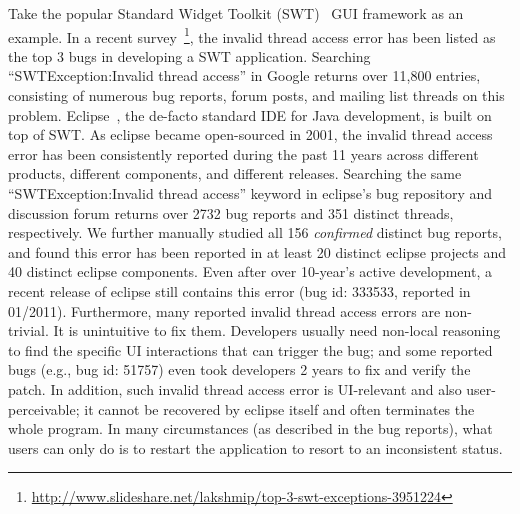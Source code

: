 Take the popular Standard Widget Toolkit (SWT)~\cite{swt} GUI framework as an example. 
In a recent survey~\footnote{\url{http://www.slideshare.net/lakshmip/top-3-swt-exceptions-3951224}}, the invalid thread access error
has been listed as the top 3 bugs in developing a SWT application. Searching
``SWTException:Invalid thread access'' in Google returns over 11,800 entries,
consisting of numerous bug reports, forum posts, and mailing list threads on
this problem. Eclipse~\cite{eclipse}, the de-facto standard IDE for Java development,
is built on top of SWT. As eclipse became open-sourced in 2001, the invalid thread access error has
been consistently reported during the past 11 years across different products, different components, and different releases.
Searching the same ``SWTException:Invalid thread access'' keyword in eclipse's bug repository
and discussion forum returns over 2732 bug reports and 351 distinct threads, respectively. 
We further manually studied all 156 \textit{confirmed} distinct bug reports, and 
found this error has been reported in at least 20 distinct eclipse projects
and 40 distinct eclipse components. Even after over 10-year's active development,
a recent release of eclipse still contains this error (bug id: 333533, reported in 01/2011).
 Furthermore, many reported invalid thread access errors are non-trivial. It is unintuitive
to fix them. Developers usually
need non-local reasoning to find the specific UI interactions that can trigger the bug; and
some reported bugs (e.g., bug id: 51757) even took developers 2 years to fix and verify the
patch. In addition, such invalid thread access error is UI-relevant and also user-perceivable;
it cannot be recovered by eclipse itself and often terminates the whole program.
In many circumstances (as described in the bug reports),
what users can only do is to restart the application to resort to an inconsistent status.




